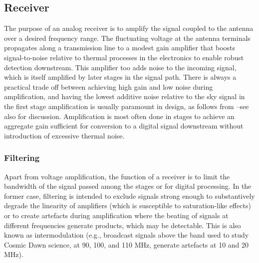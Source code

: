   
 
\subsection{Receiver}


The purpose of an analog receiver is to amplify the signal coupled to the antenna over a desired frequency range.  The fluctuating voltage at the antenna terminals propagates along a transmission line to a modest gain amplifier that boosts signal-to-noise relative to thermal processes in the electronics to enable robust detection downstream.  This amplifier too adds noise to the incoming signal, which is itself amplified by later stages in the signal path.    There is always a practical trade off between achieving high gain and low noise during amplification, and having the lowest additive noise relative to the sky signal in the first stage amplification is usually paramount in design, as follows from \cite{friis46}--see also \cite{pozar98} for discussion.  Amplification is most often done in stages to achieve an aggregate gain sufficient for conversion to a digital signal downstream without introduction of excessive thermal noise. 


\subsubsection{Filtering}

Apart from voltage amplification, the function of a receiver is to limit the bandwidth of the signal passed among the stages or for digital processing.  In the former case, filtering is  intended to exclude signals strong enough to substantively degrade the linearity of amplifiers (which is susceptible to saturation-like effects) or to create artefacts during amplification where the beating of signals at different frequencies generate products, which may be detectable. This is also known as intermodulation (e.g., broadcast signals above the band used to study Cosmic Dawn science,  at 90, 100, and 110 MHz, generate artefacts at 10 and 20 MHz).  

